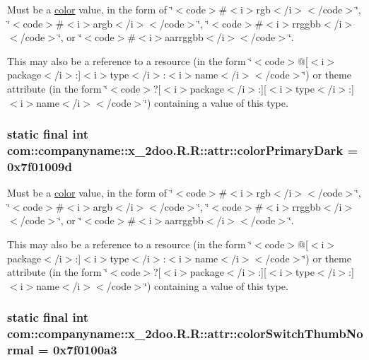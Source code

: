 Must be a \hyperlink{classcom_1_1companyname_1_1x__2doo_1_1_r_1_1color}{color} value, in the form of \char`\"{}$<$code$>$\#$<$i$>$rgb$<$/i$>$$<$/code$>$\char`\"{}, \char`\"{}$<$code$>$\#$<$i$>$argb$<$/i$>$$<$/code$>$\char`\"{}, \char`\"{}$<$code$>$\#$<$i$>$rrggbb$<$/i$>$$<$/code$>$\char`\"{}, or \char`\"{}$<$code$>$\#$<$i$>$aarrggbb$<$/i$>$$<$/code$>$\char`\"{}. 

This may also be a reference to a resource (in the form \char`\"{}$<$code$>$@\mbox{[}$<$i$>$package$<$/i$>$:\mbox{]}$<$i$>$type$<$/i$>$:$<$i$>$name$<$/i$>$$<$/code$>$\char`\"{}) or theme attribute (in the form \char`\"{}$<$code$>$?\mbox{[}$<$i$>$package$<$/i$>$:\mbox{]}\mbox{[}$<$i$>$type$<$/i$>$:\mbox{]}$<$i$>$name$<$/i$>$$<$/code$>$\char`\"{}) containing a value of this type. \hypertarget{classcom_1_1companyname_1_1x__2doo_1_1_r_1_1attr_85b6ea9e574ea4e25b8964f00757ccd2}{
\subsubsection[{colorPrimaryDark}]{\setlength{\rightskip}{0pt plus 5cm}static final int com::companyname::x\_\-2doo.R.R::attr::colorPrimaryDark = 0x7f01009d}}
\label{classcom_1_1companyname_1_1x__2doo_1_1_r_1_1attr_85b6ea9e574ea4e25b8964f00757ccd2}


Must be a \hyperlink{classcom_1_1companyname_1_1x__2doo_1_1_r_1_1color}{color} value, in the form of \char`\"{}$<$code$>$\#$<$i$>$rgb$<$/i$>$$<$/code$>$\char`\"{}, \char`\"{}$<$code$>$\#$<$i$>$argb$<$/i$>$$<$/code$>$\char`\"{}, \char`\"{}$<$code$>$\#$<$i$>$rrggbb$<$/i$>$$<$/code$>$\char`\"{}, or \char`\"{}$<$code$>$\#$<$i$>$aarrggbb$<$/i$>$$<$/code$>$\char`\"{}. 

This may also be a reference to a resource (in the form \char`\"{}$<$code$>$@\mbox{[}$<$i$>$package$<$/i$>$:\mbox{]}$<$i$>$type$<$/i$>$:$<$i$>$name$<$/i$>$$<$/code$>$\char`\"{}) or theme attribute (in the form \char`\"{}$<$code$>$?\mbox{[}$<$i$>$package$<$/i$>$:\mbox{]}\mbox{[}$<$i$>$type$<$/i$>$:\mbox{]}$<$i$>$name$<$/i$>$$<$/code$>$\char`\"{}) containing a value of this type. \hypertarget{classcom_1_1companyname_1_1x__2doo_1_1_r_1_1attr_1e1b901072bbc103b0d955570196a458}{
\subsubsection[{colorSwitchThumbNormal}]{\setlength{\rightskip}{0pt plus 5cm}static final int com::companyname::x\_\-2doo.R.R::attr::colorSwitchThumbNormal = 0x7f0100a3}}
\label{classcom_1_1companyname_1_1x__2doo_1_1_r_1_1attr_1e1b901072bbc103b0d955570196a458}


